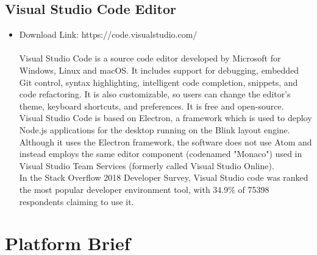 \subsection{Visual Studio Code Editor}
\begin{itemize}
\item Download Link: https://code.visualstudio.com/ \\ \\ Visual Studio Code is a source code editor developed by Microsoft for Windows, Linux and macOS. It includes support for debugging, embedded Git control, syntax highlighting, intelligent code completion, snippets, and code refactoring. It is also customizable, so users can change the editor's theme, keyboard shortcuts, and preferences. It is free and open-source. \\ Visual Studio Code is based on Electron, a framework which is used to deploy Node.js applications for the desktop running on the Blink layout engine. Although it uses the Electron framework, the software does not use Atom and instead employs the same editor component (codenamed "Monaco") used in Visual Studio Team Services (formerly called Visual Studio Online). \\ In the Stack Overflow 2018 Developer Survey, Visual Studio code was ranked the most popular developer environment tool, with 34.9\% of 75398 respondents claiming to use it.\cite{VSC}
\end{itemize}

\section{Platform Brief}
